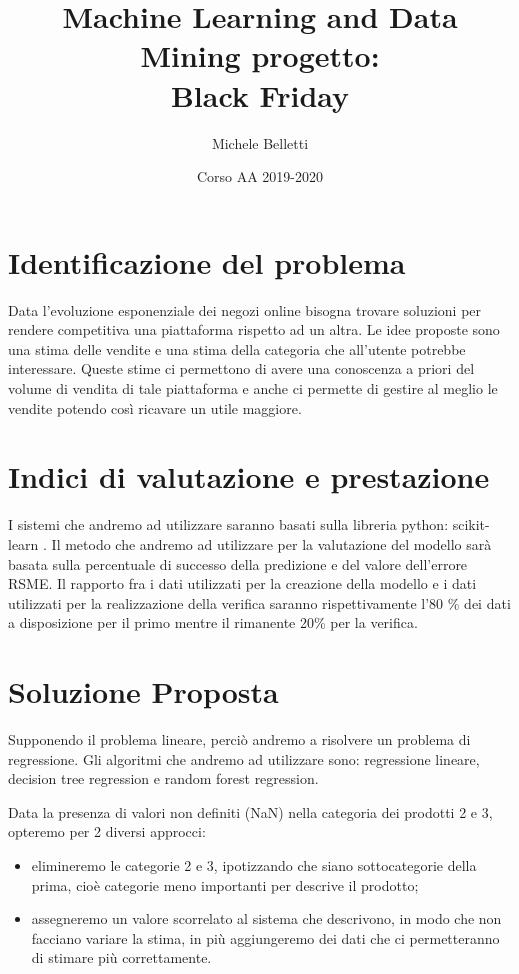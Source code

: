 \documentclass{article}
\title{Machine Learning and Data Mining progetto:\\Black Friday}
\author{Michele Belletti}
\date{Corso AA 2019-2020}
\begin{document}
\maketitle



\section{Identificazione del problema}
Data l'evoluzione esponenziale dei negozi online bisogna trovare soluzioni per rendere competitiva una piattaforma rispetto ad un altra. Le idee proposte sono una stima delle vendite e una stima della categoria che all'utente potrebbe interessare. Queste stime ci permettono di avere una conoscenza a priori del volume di vendita di tale piattaforma e anche ci permette di gestire al meglio le vendite potendo così ricavare un utile maggiore.

\section{Indici di valutazione e prestazione}
I sistemi che andremo ad utilizzare saranno basati sulla libreria python: scikit-learn \cite{scikit-learn} .
Il metodo che andremo ad utilizzare per la valutazione del modello sarà basata sulla percentuale di successo della predizione e del valore dell'errore RSME.
Il rapporto fra i dati utilizzati per la creazione della modello e i dati utilizzati per la realizzazione della verifica saranno rispettivamente l'80 \% dei dati a disposizione per il primo mentre il rimanente 20\% per la verifica.

\section{Soluzione Proposta}
Supponendo il problema  lineare, perciò andremo a risolvere un problema di regressione. Gli algoritmi che andremo ad utilizzare sono: regressione lineare, decision tree regression e random forest regression.

Data la presenza di valori non definiti (NaN) nella categoria dei prodotti 2 e 3, opteremo per 2 diversi approcci:
\begin{itemize}
\item elimineremo le categorie 2 e 3, ipotizzando che siano sottocategorie della prima, cioè categorie meno importanti per descrive il prodotto;
\item assegneremo un valore scorrelato al sistema che descrivono, in modo che non facciano variare la stima, in più aggiungeremo dei dati che ci permetteranno di stimare più correttamente.
\end{itemize}
\end{document}

